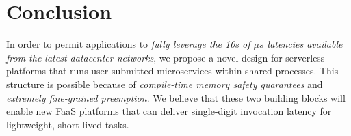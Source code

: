 \section{Conclusion}
\label{sec:concl}

In order to permit applications to \textit{fully leverage the 10s of $\mu{}s$
latencies available from the latest datacenter networks}, we propose a novel design
for serverless platforms that runs user-submitted microservices within shared
processes.  This structure is possible because of
\textit{compile-time memory safety guarantees} and \textit{extremely fine-grained
preemption}.  We believe that these
two building blocks will enable new FaaS platforms that can deliver single-digit
invocation latency for lightweight, short-lived tasks.

